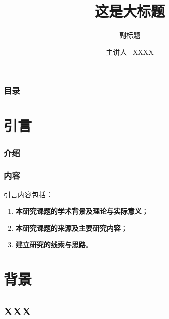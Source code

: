 \documentclass[AutoFakeBold,AutoFakeSlant，fontset=windows]{beamer}
\title[Latex:texstudio2overleaf]{
  这是大标题} %
\subtitle{副标题} %
\institute[Sun Yat-Sen University]{
  中山大学 \\ 物理与天文学院
  }
\date[\today]{\ctoday}
\begin{document}
\author[netid@mail2.sysu.edu.cn]{
  主讲人  \ XXXX
  \texorpdfstring{\\}{XXX}
}

\begin{frame}
  \titlepage
\end{frame}
\setcounter{framenumber}{0}

\begin{frame}
  \frametitle{目\quad 录}
  \tableofcontents[hideallsubsections]
\end{frame}

\section{引言}

\begin{frame}
  \frametitle{介绍}

\end{frame}

\begin{frame}
  \frametitle{内容}

  引言内容包括：
  \begin{enumerate}
    \item \textbf{本研究课题的学术背景及理论与实际意义}；
    \item \textbf{本研究课题的来源及主要研究内容}；
    \item \textbf{建立研究的线索与思路}。
  \end{enumerate}

\end{frame}

\section{背景}

\subsection{XXX}
\end{document}
